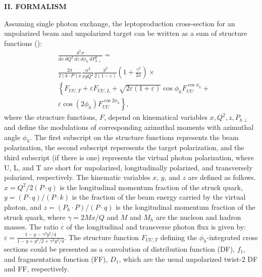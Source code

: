 \documentclass[aps,prl,twocolumn,showpacs,superscriptaddress,groupedaddress]{revtex4-1}  %
\newcommand{\zh}{z}
\newcommand{\xbj}{x}
\begin{document}
\begin{center}
\textbf{II. FORMALISM} \par
\end{center}
Assuming single photon exchange, the leptoproduction cross-section for an unpolarized beam and unpolarized target can be written as a sum of structure functions (\cite{Bacchetta:2006tn}):
\begin{equation}
\label{eq:crosssection3}
\begin{split}
& \frac{d^{5} \sigma}{dx\ dQ^2\ dz\ d \phi_{h}\ dP_{h \perp}^{2}} =
\\
& \frac{2\pi}{2(k\cdot P)x} \frac{\alpha^{2}}{xyQ^{2}} \frac{y^{2}}{2 \left( 1 - \varepsilon \right)} \left( 1 + \frac{\gamma^{2}}{2x} \right) \times
\\
& \left\{ F_{UU,T} + \varepsilon F_{UU,L} + \sqrt{2 \varepsilon \left( 1 + \varepsilon \right)} \cos \phi_{h} F^{\cos \phi_{h}}_{UU} + \right.
\\
& \left. \varepsilon \cos \left( 2 \phi_{h} \right) F_{UU}^{\cos2\phi_{h}} \right\},
\end{split}
\end{equation}
where the structure functions, $F$, depend on kinematical variables $x,Q^2,z,P_{h\perp}$ and define the modulations of corresponding azimuthal moments with azimuthal angle $\phi_{h}$.
The first subscript on the structure functions represents the beam polarization, the second subscript repsresents the target polarization, and the third subscript (if there is one) represents the virtual photon polarization, where U, L, and T are short for unpolarized, longitudinally polarized, and transversely polarized, respectively.
The kinematic variables $\xbj$, $y$, and $z$  are defined as follows.
$\xbj = Q^2/{2(P\cdot q)}$ is the longitudinal momentum fraction of the struck quark, 
$y={(P \cdot q)/(P \cdot k)}$ is the fraction of the beam energy carried by the virtual photon,
and $\zh=(P_h \cdot P)/(P \cdot q)$ is the longitudinal momentum fraction of the struck quark, 
where $\gamma=2M\xbj /Q$ and $M$ and $M_h$ are the nucleon and hadron masses.
The ratio $\varepsilon$ of the longitudinal and transverse photon flux is given by: $\varepsilon=\frac{1-y-\gamma^2y^2/4}{1-y+y^2/2+\gamma^2y^2/4}$.
The structure function  $F_{UU,T}$  defining the $\phi_h$-integrated cross sections could be presented as a convolution of  distribution function (DF), $f_1$,   and fragmentation function (FF), $D_1$, which  are the usual unpolarized twist-2 DF and FF, respectively. 
\end{document}
